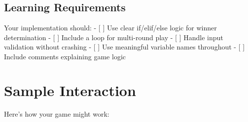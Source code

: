 \documentclass[
  letterpaper,
  DIV=11,
  numbers=noendperiod,
  oneside]{scrreprt}
\begin{document}
\subsection{Learning Requirements}\label{learning-requirements-3}

Your implementation should: - {[} {]} Use clear if/elif/else logic for
winner determination - {[} {]} Include a loop for multi-round play - {[}
{]} Handle input validation without crashing - {[} {]} Use meaningful
variable names throughout - {[} {]} Include comments explaining game
logic

\section{Sample Interaction}\label{sample-interaction-3}

Here's how your game might work:
\end{document}
